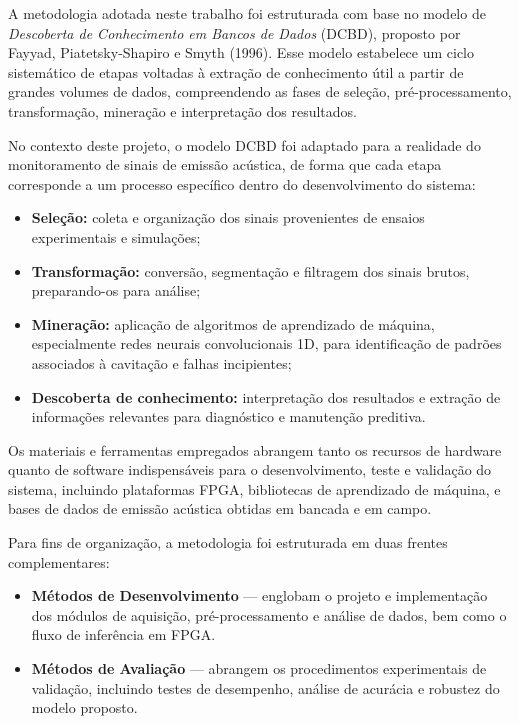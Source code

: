 A metodologia adotada neste trabalho foi estruturada com base no modelo de \textit{Descoberta de Conhecimento em Bancos de Dados} (DCBD), proposto por Fayyad, Piatetsky-Shapiro e Smyth (1996). Esse modelo estabelece um ciclo sistemático de etapas voltadas à extração de conhecimento útil a partir de grandes volumes de dados, compreendendo as fases de seleção, pré-processamento, transformação, mineração e interpretação dos resultados.

No contexto deste projeto, o modelo DCBD foi adaptado para a realidade do monitoramento de sinais de emissão acústica, de forma que cada etapa corresponde a um processo específico dentro do desenvolvimento do sistema:
\begin{itemize}
    \item \textbf{Seleção:} coleta e organização dos sinais provenientes de ensaios experimentais e simulações;
    \item \textbf{Transformação:} conversão, segmentação e filtragem dos sinais brutos, preparando-os para análise;
    \item \textbf{Mineração:} aplicação de algoritmos de aprendizado de máquina, especialmente redes neurais convolucionais 1D, para identificação de padrões associados à cavitação e falhas incipientes;
    \item \textbf{Descoberta de conhecimento:} interpretação dos resultados e extração de informações relevantes para diagnóstico e manutenção preditiva.
\end{itemize}

Os materiais e ferramentas empregados abrangem tanto os recursos de hardware quanto de software indispensáveis para o desenvolvimento, teste e validação do sistema, incluindo plataformas FPGA, bibliotecas de aprendizado de máquina, e bases de dados de emissão acústica obtidas em bancada e em campo.

Para fins de organização, a metodologia foi estruturada em duas frentes complementares:
\begin{itemize}
    \item \textbf{Métodos de Desenvolvimento} — englobam o projeto e implementação dos módulos de aquisição, pré-processamento e análise de dados, bem como o fluxo de inferência em FPGA.
    \item \textbf{Métodos de Avaliação} — abrangem os procedimentos experimentais de validação, incluindo testes de desempenho, análise de acurácia e robustez do modelo proposto.
\end{itemize}

